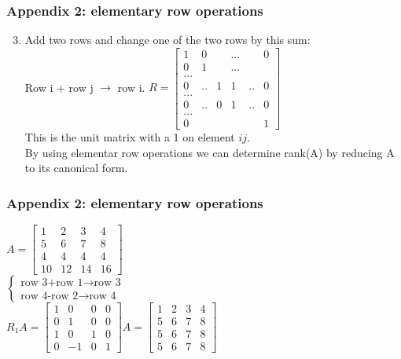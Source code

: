 \begin{frame}
	\frametitle{Appendix 2: elementary row operations}
	\begin{enumerate}
		\setcounter{enumi}{2}
		\item Add two rows and change one of the two rows by this sum:\\
		Row i + row j $\rightarrow$ row i. $R=\begin{bmatrix}
			1 & 0 & & ...& & 0\\
			0 & 1 & & ... &  & \\
			... & & & & & \\
			0 & .. & 1 & 1 & .. & 0\\
			... & & &  & & \\
			0 & .. & 0 & 1 & .. & 0\\
			... &  & & & & \\
			0 & & & & & 1
		\end{bmatrix}$\\
		This is the unit matrix with a 1 on element $ij$.\\
		By using elementar row  operations we can determine rank(A) by reducing A to its canonical form.
	\end{enumerate}
\end{frame}

\begin{frame}
	\frametitle{Appendix 2: elementary row operations}
	$A=\begin{bmatrix}
	1 & 2& 3 & 4\\
	5 & 6 & 7 & 8 \\
	4 & 4 & 4 & 4\\
	10 & 12 & 14 & 16
	\end{bmatrix}$\\
	$\begin{cases}
		\text{row 3+row 1} \rightarrow \text{row 3}\\
		\text{row 4-row 2} \rightarrow \text{row 4}
	\end{cases}$\\ $R_1A=\begin{bmatrix}
	1 & 0 & 0& 0\\
	0 & 1 & 0 & 0\\
	1 & 0 & 1 & 0\\
	0 & -1 & 0 & 1
	\end{bmatrix}A=\begin{bmatrix}
	1 & 2 & 3 & 4\\
	5 & 6 & 7 & 8\\
	5 & 6 & 7 & 8\\
	5 & 6 & 7 & 8
	\end{bmatrix}$
\end{frame}

